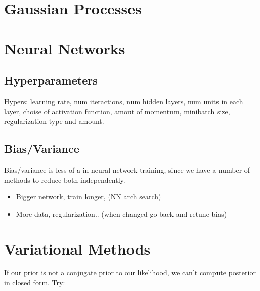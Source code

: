 \documentclass[11pt]{article}
\begin{document}
\section{Gaussian Processes}
\label{sec:gp}



\section{Neural Networks}
\label{sec:nn}

\subsection{Hyperparameters}
Hypers: learning rate, num iteractions, num hidden layers, num units in each
layer, choise of activation function, amout of momentum, minibatch size,
regularization type and amount.

\subsection{Bias/Variance}

Bias/variance is less of a  in neural network training, since we
have a number of methods to reduce both independently.
\begin{itemize}
  \item {} Bigger network, train longer, (NN
  arch search)
  \item {} More data, regularization.. (when
  changed go back and retune bias)
\end{itemize}


\section{Variational Methods}
\label{sec:var_meth}

If our prior is not a conjugate prior to our likelihood, we can't compute
posterior in closed form. Try:
\end{document}
